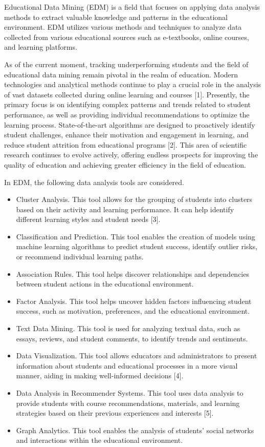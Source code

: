 \documentclass[letterpaper]{article}
\begin{document}
\begin{multicols}{2}
\begin{justify}
      Educational Data Mining (EDM) is a field that focuses on applying data analysis methods to extract valuable knowledge and patterns in the educational environment. EDM utilizes various methods and techniques to analyze data collected from various educational sources such as e-textbooks, online courses, and learning platforms.

      As of the current moment, tracking underperforming students and the field of educational data mining remain pivotal in the realm of education. Modern technologies and analytical methods continue to play a crucial role in the analysis of vast datasets collected during online learning and courses [1]. Presently, the primary focus is on identifying complex patterns and trends related to student performance, as well as providing individual recommendations to optimize the learning process. State-of-the-art algorithms are designed to proactively identify student challenges, enhance their motivation and engagement in learning, and reduce student attrition from educational programs [2]. This area of scientific research continues to evolve actively, offering endless prospects for improving the quality of education and achieving greater efficiency in the field of education.

      In EDM, the following data analysis tools are considered.
      \begin{itemize}
        \item Cluster Analysis. This tool allows for the grouping of students into clusters based on their activity and learning performance. It can help identify different learning styles and student needs [3].
        \item Classification and Prediction. This tool enables the creation of models using machine learning algorithms to predict student success, identify outlier risks, or recommend individual learning paths.
        \item Association Rules. This tool helps discover relationships and dependencies between student actions in the educational environment.
        \item Factor Analysis. This tool helps uncover hidden factors influencing student success, such as motivation, preferences, and the educational environment.
        \item Text Data Mining. This tool is used for analyzing textual data, such as essays, reviews, and student comments, to identify trends and sentiments.
        \item Data Visualization. This tool allows educators and administrators to present information about students and educational processes in a more visual manner, aiding in making well-informed decisions [4].
        \item Data Analysis in Recommender Systems. This tool uses data analysis to provide students with course recommendations, materials, and learning strategies based on their previous experiences and interests [5].
        \item Graph Analytics. This tool enables the analysis of students' social networks and interactions within the educational environment.
      \end{itemize}


\end{justify}
\end{multicols}
\end{document}

